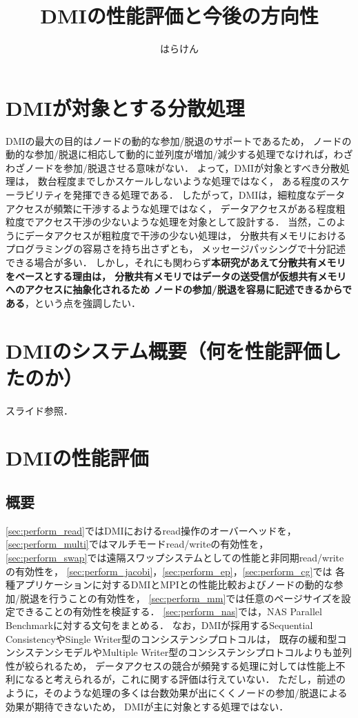 \documentclass[10pt]{jsarticle}
\title{DMIの性能評価と今後の方向性}
\author{はらけん}
\date{\mytoday}
\begin{document}
\maketitle

\section{DMIが対象とする分散処理}
\label{sec:target}

DMIの最大の目的はノードの動的な参加/脱退のサポートであるため，
ノードの動的な参加/脱退に相応して動的に並列度が増加/減少する処理でなければ，わざわざノードを参加/脱退させる意味がない．
よって，DMIが対象とすべき分散処理は，
数台程度までしかスケールしないような処理ではなく，
ある程度のスケーラビリティを発揮できる処理である．
したがって，DMIは，細粒度なデータアクセスが頻繁に干渉するような処理ではなく，
データアクセスがある程度粗粒度でアクセス干渉の少ないような処理を対象として設計する．
当然，このようにデータアクセスが粗粒度で干渉の少ない処理は，
分散共有メモリにおけるプログラミングの容易さを持ち出さずとも，
メッセージパッシングで十分記述できる場合が多い．
しかし，それにも関わらず\textbf{本研究があえて分散共有メモリをベースとする理由は，
分散共有メモリではデータの送受信が仮想共有メモリへのアクセスに抽象化されるため
ノードの参加/脱退を容易に記述できるからである}，という点を強調したい．

\section{DMIのシステム概要（何を性能評価したのか）}

スライド参照．

\section{DMIの性能評価}

\subsection{概要}

\ref{sec:perform_read}ではDMIにおけるread操作のオーバーヘッドを，
\ref{sec:perform_multi}ではマルチモードread/writeの有効性を，
\ref{sec:perform_swap}では遠隔スワップシステムとしての性能と非同期read/writeの有効性を，
\ref{sec:perform_jacobi}，\ref{sec:perform_ep}，\ref{sec:perform_cg}では
各種アプリケーションに対するDMIとMPIとの性能比較およびノードの動的な参加/脱退を行うことの有効性を，
\ref{sec:perform_mm}では任意のページサイズを設定できることの有効性を検証する．
\ref{sec:perform_nas}では，NAS Parallel Benchmarkに対する文句をまとめる．
なお，DMIが採用するSequential ConsistencyやSingle Writer型のコンシステンシプロトコルは，
既存の緩和型コンシステンシモデルやMultiple Writer型のコンシステンシプロトコルよりも並列性が絞られるため，
データアクセスの競合が頻発する処理に対しては性能上不利になると考えられるが，これに関する評価は行えていない．
ただし，前述のように，そのような処理の多くは台数効果が出にくくノードの参加/脱退による効果が期待できないため，
DMIが主に対象とする処理ではない．
\end{document}
